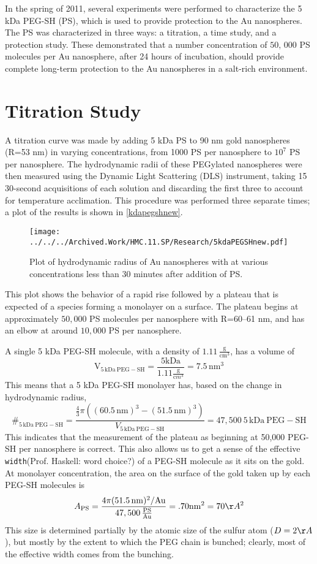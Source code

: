In the spring of 2011, several experiments were performed to characterize the 5 kDa PEG-SH (PS), which is used to provide protection to the Au nanospheres. The PS was characterized in three ways: a titration, a time study, and a protection study. These demonstrated that a number concentration of $50,\,000$ PS molecules per Au nanosphere, after 24 hours of incubation, should provide complete long-term protection to the Au nanospheres in a salt-rich environment.

\section{Titration Study}
\label{titrationstudy}

A titration curve was made by adding 5 kDa PS to 90 nm gold nanospheres (R=53 nm) in varying concentrations, from 1000 PS per nanosphere to $10^7$ PS per nanosphere. The hydrodynamic radii of these PEGylated nanospheres were then measured using the Dynamic Light Scattering (DLS) instrument, taking 15 30-second acquisitions of each solution and discarding the first three to account for temperature acclimation. This procedure was performed three separate times; a plot of the results is shown in \autoref{kdapegshnew}.

\begin{figure}[htbp]
\centering
\texttt{[image: ../../../Archived.Work/HMC.11.SP/Research/5kdaPEGSHnew.pdf]}
\caption{Plot of hydrodynamic radius of Au nanospheres with at various concentrations less than 30 minutes after addition of PS.}
\label{kdapegshnew}
\end{figure}



This plot shows the behavior of a rapid rise followed by a plateau that is expected of a species forming a monolayer on a surface. The plateau begins at approximately $50,000$ PS molecules per nanosphere with R=60--61 nm, and has an elbow at around $10,000$ PS per nanosphere.

A single 5 kDa PEG-SH molecule, with a density of $1.11\,\mathrm{\frac{g}{cm^3}}$, has a volume of \[\mathrm{V_{5\,kDa\ PEG-SH}}=\frac{5\mathrm{kDa}}{1.11\frac{\mathrm g}{\mathrm cm^3}}=7.5\mathrm{\,nm^3}\]
This means that a 5 kDa PEG-SH monolayer has, based on the change in hydrodynamic radius,
\[\#_{\mathrm{5\,kDa\ PEG-SH}}=\frac{\frac{4}{3}\pi((60.5\mathrm{\,nm})^3-(51.5\mathrm{\,nm})^3)}{V_{\mathrm{5\,kDa\ PEG-SH}}}=47,500\mathrm{\ 5\,kDa\ PEG-SH}\]
This indicates that the measurement of the plateau as beginning at 50,000 PEG-SH per nanosphere is correct. This also allows us to get a sense of the effective \texttt{width}(Prof. Haskell: word choice?) of a PEG-SH molecule as it sits on the gold. At monolayer concentration, the area on the surface of the gold taken up by each PEG-SH molecules is \[A_{\mathrm{PS}}=\frac{4\pi(51.5 \mathrm{\,nm})^2/\mathrm{Au}}{47,500\,\mathrm{\frac{PS}{Au}}}=.70\mathrm{nm}^2=70\AA^2\]
This size is determined partially by the atomic size of the sulfur atom ($D=2\AA$), but mostly by the extent to which the PEG chain is bunched; clearly, most of the effective width comes from the bunching.

